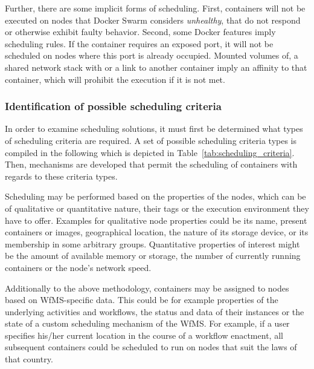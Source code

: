     Further, there are some implicit forms of scheduling. First, containers will not be executed on nodes that Docker Swarm considers \emph{unhealthy}, \ie that do not respond or otherwise exhibit faulty behavior. Second, some Docker features imply scheduling rules. If the container requires an exposed port, it will not be scheduled on nodes where this port is already occupied. Mounted volumes of, a shared network stack with or a link to another container imply an affinity to that container, which will prohibit the execution if it is not met.

  \subsubsection{Identification of possible scheduling criteria} %
  \label{ssub:identification_of_desired_scheduling_criteria}

    In order to examine scheduling solutions, it must first be determined what types of scheduling criteria are required. A set of possible scheduling criteria types is compiled in the following which is depicted in Table~\ref{tab:scheduling_criteria}. Then, mechanisms are developed that permit the scheduling of containers with regards to these criteria types.

    Scheduling may be performed based on the properties of the nodes, which can be of qualitative or quantitative nature, their tags or the execution environment they have to offer. Examples for qualitative node properties could be its name, present containers or images, geographical location, the nature of its storage device, or its membership in some arbitrary groups. Quantitative properties of interest might be the amount of available memory or storage, the number of currently running containers or the node's network speed.

    Additionally to the above methodology, containers may be assigned to nodes based on \ac{WfMS}-specific data. This could be for example properties of the underlying activities and workflows, the status and data of their instances or the state of a custom scheduling mechanism of the \ac{WfMS}. For example, if a user specifies his/her current location in the course of a workflow enactment, all subsequent containers could be scheduled to run on nodes that suit the laws of that country.

